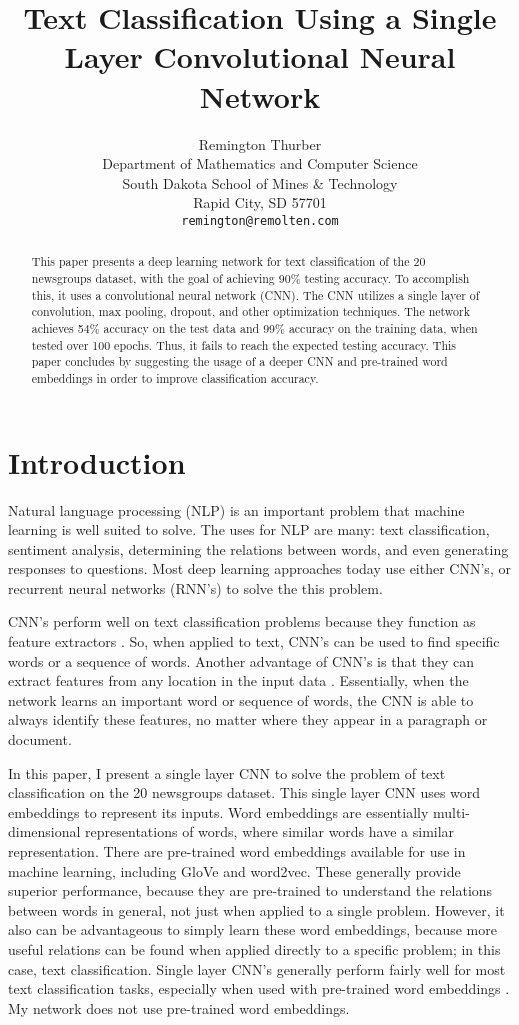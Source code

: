 \documentclass{article}
\title{Text Classification Using a Single Layer Convolutional Neural Network}
\author{
  Remington Thurber \\
  Department of Mathematics and Computer Science \\
  South Dakota School of Mines \& Technology \\
  Rapid City, SD 57701 \\
  \texttt{remington@remolten.com} \\
}
\begin{document}
\maketitle

\begin{abstract}
This paper presents a deep learning network for text classification of the 20 newsgroups dataset, with the goal of achieving
90\% testing accuracy. To accomplish this, it uses a convolutional
neural network (CNN). The CNN utilizes a single layer of convolution, max pooling, dropout, and other optimization techniques.
The network achieves 54\% accuracy on the test data and 99\% accuracy on the training data, when tested over 100 epochs.
Thus, it fails to reach the expected testing accuracy.
This paper concludes by suggesting the usage of a deeper CNN and pre-trained word embeddings in order to improve classification accuracy.
\end{abstract}

\section{Introduction}
Natural language processing (NLP) is an important problem that machine learning is well suited to solve. The uses for NLP are many:
text classification, sentiment analysis, determining the relations between words, and even generating responses to questions.
Most deep learning approaches today use either CNN's, or recurrent neural networks (RNN's) to solve the this problem.

CNN's perform well on text classification problems because they function as feature extractors \cite{zhang}. So, when
applied to text, CNN's can be used to find specific words or a sequence of words. Another advantage of CNN's is that they can extract features
from any location in the input data \cite{goldberg}. Essentially, when the network learns an important word or sequence of words,
the CNN is able to always identify these features, no matter where they appear in a paragraph or document.

In this paper, I present a single layer CNN to solve the problem of text classification on the 20 newsgroups dataset. This single layer CNN
uses word embeddings to represent its inputs. Word embeddings are essentially multi-dimensional representations of
words, where similar words have a similar representation. There are pre-trained word embeddings available for use in machine learning,
including GloVe and word2vec. These generally provide superior performance, because they are pre-trained to understand the relations
between words in general, not just when applied to a single problem. However, it also can be advantageous to simply learn these word
embeddings, because more useful relations can be found when applied directly to a specific problem; in this case, text classification.
Single layer CNN's generally perform fairly well for most text classification tasks, especially when used with pre-trained word
embeddings \cite{kim} \cite{goldberg}. My network does not use pre-trained word embeddings.
\end{document}
